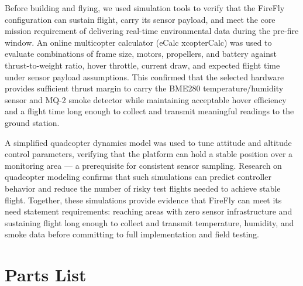 \documentclass[journal, onecolumn]{IEEEtran}
\begin{document}
Before building and flying, we used simulation tools to verify that the FireFly configuration can sustain flight, carry its sensor payload, and meet the core mission requirement of delivering real-time environmental data during the pre-fire window. An online multicopter calculator (eCalc xcopterCalc) was used to evaluate combinations of frame size, motors, propellers, and battery against thrust-to-weight ratio, hover throttle, current draw, and expected flight time under sensor payload assumptions. This confirmed that the selected hardware provides sufficient thrust margin to carry the BME280 temperature/humidity sensor and MQ-2 smoke detector while maintaining acceptable hover efficiency and a flight time long enough to collect and transmit meaningful readings to the ground station.

\vspace{0.5em}

A simplified quadcopter dynamics model was used to tune attitude and altitude control parameters, verifying that the platform can hold a stable position over a monitoring area --- a prerequisite for consistent sensor sampling. Research on quadcopter modeling confirms that such simulations can predict controller behavior and reduce the number of risky test flights needed to achieve stable flight. Together, these simulations provide evidence that FireFly can meet its need statement requirements: reaching areas with zero sensor infrastructure and sustaining flight long enough to collect and transmit temperature, humidity, and smoke data before committing to full implementation and field testing.

\newpage

\section{Parts List}
\end{document}
